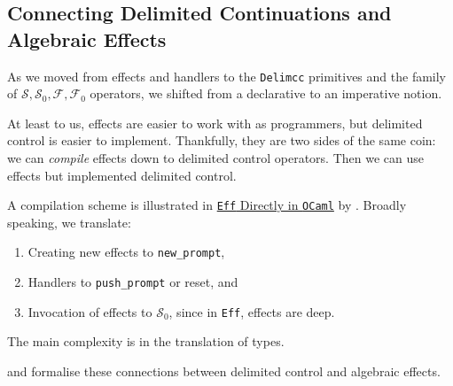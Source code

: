 


\subsection{Connecting Delimited Continuations and Algebraic Effects}
As we moved from effects and handlers to the \texttt{Delimcc} primitives and the family of $\mathcal{S}, \mathcal{S}_0, \mathcal{F}, \mathcal{F}_0$ operators, we shifted from a declarative to an imperative notion. 

At least to us, effects are easier to work with as programmers, but delimited control is easier to implement. Thankfully, they are two sides of the same coin: we can \textit{compile} effects down to delimited control operators. Then we can use effects but implemented delimited control. 

A compilation scheme is illustrated in \href{https://arxiv.org/pdf/1812.11664}{\texttt{Eff} Directly in \texttt{OCaml}} by \citet{kiselyov-2018}. Broadly speaking, we translate:
\begin{enumerate}
    \item Creating new effects to \texttt{new\_prompt},
    \item Handlers to \texttt{push\_prompt} or reset, and 
    \item Invocation of effects to $\mathcal{S}_0$, since in \texttt{Eff}, effects are deep.
\end{enumerate}

The main complexity is in the translation of types. 

\citet{forster-2017} and \citet{pirog-2019} formalise these connections between delimited control and algebraic effects. 

